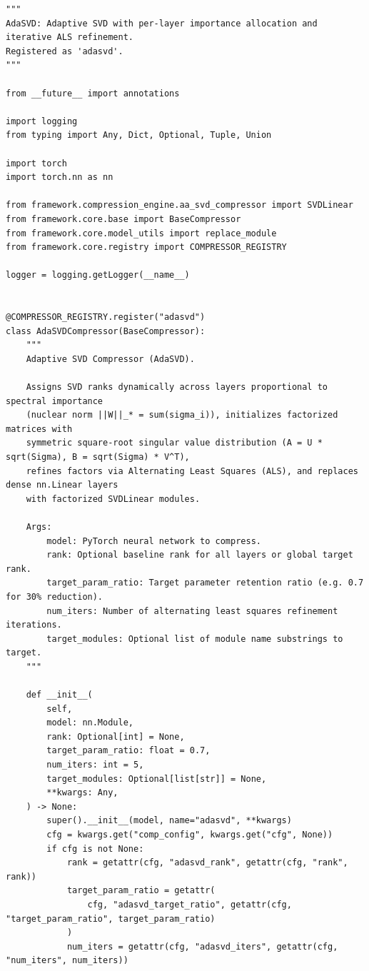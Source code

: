 \begin{lstlisting}
"""
AdaSVD: Adaptive SVD with per-layer importance allocation and iterative ALS refinement.
Registered as 'adasvd'.
"""

from __future__ import annotations

import logging
from typing import Any, Dict, Optional, Tuple, Union

import torch
import torch.nn as nn

from framework.compression_engine.aa_svd_compressor import SVDLinear
from framework.core.base import BaseCompressor
from framework.core.model_utils import replace_module
from framework.core.registry import COMPRESSOR_REGISTRY

logger = logging.getLogger(__name__)


@COMPRESSOR_REGISTRY.register("adasvd")
class AdaSVDCompressor(BaseCompressor):
    """
    Adaptive SVD Compressor (AdaSVD).

    Assigns SVD ranks dynamically across layers proportional to spectral importance
    (nuclear norm ||W||_* = sum(sigma_i)), initializes factorized matrices with
    symmetric square-root singular value distribution (A = U * sqrt(Sigma), B = sqrt(Sigma) * V^T),
    refines factors via Alternating Least Squares (ALS), and replaces dense nn.Linear layers
    with factorized SVDLinear modules.

    Args:
        model: PyTorch neural network to compress.
        rank: Optional baseline rank for all layers or global target rank.
        target_param_ratio: Target parameter retention ratio (e.g. 0.7 for 30% reduction).
        num_iters: Number of alternating least squares refinement iterations.
        target_modules: Optional list of module name substrings to target.
    """

    def __init__(
        self,
        model: nn.Module,
        rank: Optional[int] = None,
        target_param_ratio: float = 0.7,
        num_iters: int = 5,
        target_modules: Optional[list[str]] = None,
        **kwargs: Any,
    ) -> None:
        super().__init__(model, name="adasvd", **kwargs)
        cfg = kwargs.get("comp_config", kwargs.get("cfg", None))
        if cfg is not None:
            rank = getattr(cfg, "adasvd_rank", getattr(cfg, "rank", rank))
            target_param_ratio = getattr(
                cfg, "adasvd_target_ratio", getattr(cfg, "target_param_ratio", target_param_ratio)
            )
            num_iters = getattr(cfg, "adasvd_iters", getattr(cfg, "num_iters", num_iters))


\end{lstlisting}
